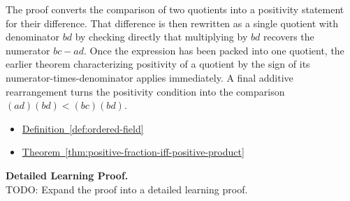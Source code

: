 \begin{remark*}
The proof converts the comparison of two quotients into a positivity statement
for their difference.  That difference is then rewritten as a single quotient
with denominator $bd$ by checking directly that multiplying by $bd$ recovers
the numerator $bc-ad$.  Once the expression has been packed into one quotient,
the earlier theorem characterizing positivity of a quotient by the sign of its
numerator-times-denominator applies immediately.  A final additive
rearrangement turns the positivity condition into the comparison
$(ad)(bd)<(bc)(bd)$.
\end{remark*}

\begin{dependencies}
\begin{itemize}
  \item \hyperref[def:ordered-field]{Definition~\ref*{def:ordered-field}}
  \item \hyperref[thm:positive-fraction-iff-positive-product]{Theorem~\ref*{thm:positive-fraction-iff-positive-product}}
\end{itemize}
\end{dependencies}

\textbf{Detailed Learning Proof.}~\\
TODO: Expand the proof into a detailed learning proof.

